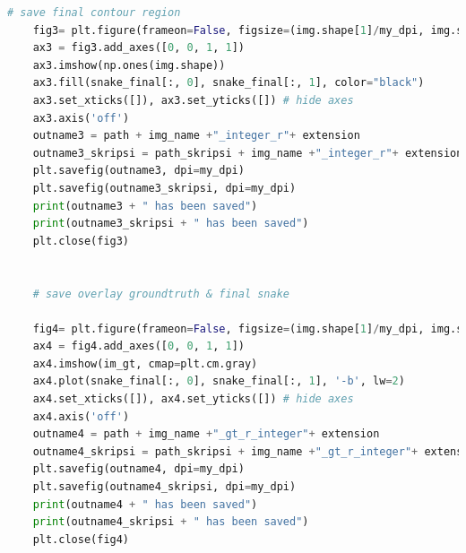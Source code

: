 \begin{lstlisting}[language=Python, basicstyle=\tiny]
	# save final contour region
	fig3= plt.figure(frameon=False, figsize=(img.shape[1]/my_dpi, img.shape[0]/my_dpi), dpi=my_dpi)
	ax3 = fig3.add_axes([0, 0, 1, 1])
	ax3.imshow(np.ones(img.shape))
	ax3.fill(snake_final[:, 0], snake_final[:, 1], color="black")
	ax3.set_xticks([]), ax3.set_yticks([]) # hide axes
	ax3.axis('off')
	outname3 = path + img_name +"_integer_r"+ extension
	outname3_skripsi = path_skripsi + img_name +"_integer_r"+ extension
	plt.savefig(outname3, dpi=my_dpi)
	plt.savefig(outname3_skripsi, dpi=my_dpi)
	print(outname3 + " has been saved")
	print(outname3_skripsi + " has been saved")
	plt.close(fig3)
	
	
	# save overlay groundtruth & final snake
	
	fig4= plt.figure(frameon=False, figsize=(img.shape[1]/my_dpi, img.shape[0]/my_dpi), dpi=my_dpi)
	ax4 = fig4.add_axes([0, 0, 1, 1])
	ax4.imshow(im_gt, cmap=plt.cm.gray)
	ax4.plot(snake_final[:, 0], snake_final[:, 1], '-b', lw=2)
	ax4.set_xticks([]), ax4.set_yticks([]) # hide axes
	ax4.axis('off')
	outname4 = path + img_name +"_gt_r_integer"+ extension
	outname4_skripsi = path_skripsi + img_name +"_gt_r_integer"+ extension
	plt.savefig(outname4, dpi=my_dpi)
	plt.savefig(outname4_skripsi, dpi=my_dpi)
	print(outname4 + " has been saved")
	print(outname4_skripsi + " has been saved")
	plt.close(fig4)
\end{lstlisting}



